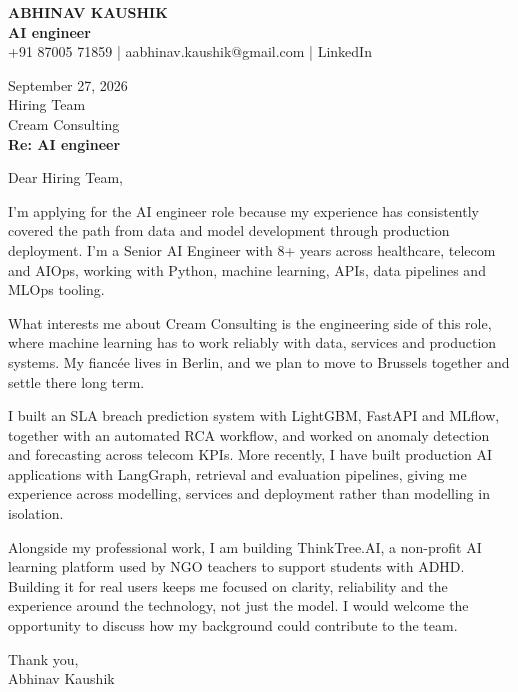 \documentclass[10pt,a4paper]{article}
\begin{document}
\begin{center}
{\Large\bfseries ABHINAV KAUSHIK}\\[2pt]
{\bfseries AI engineer}\\[2pt]
+91 87005 71859 \quad | \quad aabhinav.kaushik@gmail.com \quad | \quad LinkedIn
\end{center}
\vspace{8pt}
September 27, 2026\\[6pt]
Hiring Team\\
Cream Consulting\\[4pt]
\textbf{Re: AI engineer}

Dear Hiring Team,

I’m applying for the AI engineer role because my experience has consistently covered the path from data and model development through production deployment. I’m a Senior AI Engineer with 8+ years across healthcare, telecom and AIOps, working with Python, machine learning, APIs, data pipelines and MLOps tooling.

What interests me about Cream Consulting is the engineering side of this role, where machine learning has to work reliably with data, services and production systems. My fiancée lives in Berlin, and we plan to move to Brussels together and settle there long term.

I built an SLA breach prediction system with LightGBM, FastAPI and MLflow, together with an automated RCA workflow, and worked on anomaly detection and forecasting across telecom KPIs. More recently, I have built production AI applications with LangGraph, retrieval and evaluation pipelines, giving me experience across modelling, services and deployment rather than modelling in isolation.

Alongside my professional work, I am building ThinkTree.AI, a non-profit AI learning platform used by NGO teachers to support students with ADHD. Building it for real users keeps me focused on clarity, reliability and the experience around the technology, not just the model. I would welcome the opportunity to discuss how my background could contribute to the team.

Thank you,\\
Abhinav Kaushik
\end{document}
